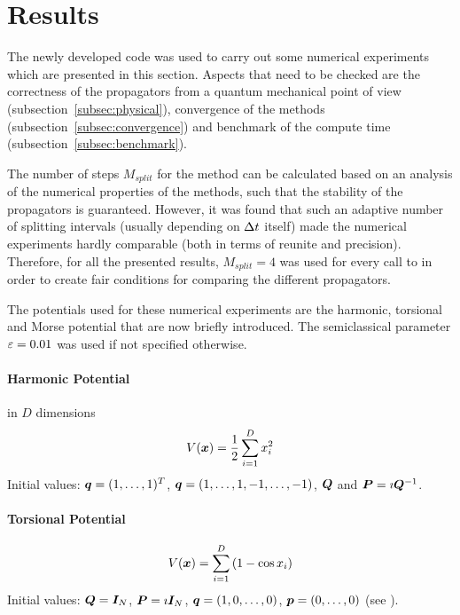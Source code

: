 \section{Results}
\label{sec:results}
%
The newly developed code was used to carry out some numerical experiments which are presented in this section.
Aspects that need to be checked are the correctness of the propagators from a quantum mechanical point of view (subsection~\ref{subsec:physical}), convergence of the methods (subsection~\ref{subsec:convergence}) and benchmark of the compute time (subsection~\ref{subsec:benchmark}).
\par\medskip
%
The number of steps $M_{split}$ for the  method can be calculated based on an analysis of the numerical properties of the methods, such that the stability of the propagators is guaranteed.
However, it was found that such an adaptive number of splitting intervals (usually depending on $\Delta t$ itself) made the numerical experiments hardly comparable (both in terms of reunite and precision).
Therefore, for all the presented results, $M_{split}=4$ was used for every call to  in order to create fair conditions for comparing the different propagators.
\par\medskip
%
The potentials used for these numerical experiments are the harmonic, torsional and Morse potential that are now briefly introduced.
The semiclassical parameter $\varepsilon = 0.01$ was used if not specified otherwise.


\paragraph{Harmonic Potential} in $D$ dimensions
\begin{align}
	\label{math:harmonic}
	V(\bm{x}) = \frac{1}{2} \sum_{i=1}^D x_i^2
\end{align}
%
Initial values: $\bm{q} = (1,\dots,1)^T$, $\bm{q} = (1,\dots,1,-1,\dots,-1)$, $\bm{Q}$ and $\bm{P} = \imath \bm{Q}^{-1}$. \\
\par\medskip


\paragraph{Torsional Potential}
%
\begin{align}
	\label{math:torsional}
	V(\bm{x}) = \sum_{i=1}^D \left( 1 - \cos x_i \right)
\end{align}
%
Initial values: $\bm{Q} = \bm{I}_N$, $\bm{P} = \imath \bm{I}_N$, $\bm{q} = (1,0,\dots,0)$, $\bm{p} = (0,\dots,0)$ (see \cite{FGL_semiclassical_dynamics}).

